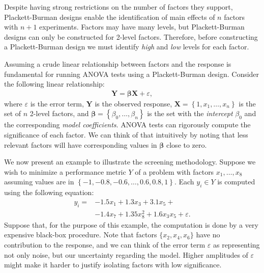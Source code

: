 \documentclass[conference]{IEEEtran}
\begin{document}
Despite having strong restrictions on the number of factors they support,
Plackett-Burman designs enable the identification of main effects of \(n\) factors
with \(n + 1\) experiments. Factors may have many levels, but Plackett-Burman
designs can only be constructed for 2-level factors. Therefore, before
constructing a Plackett-Burman design we must identify \emph{high} and \emph{low} levels
for each factor.

Assuming a crude linear relationship between factors and the response is
fundamental for running ANOVA tests using a Plackett-Burman design. Consider the
following linear relationship:
\vspace{-5pt}
{\normalsize
\begin{align}
\mathbf{Y} = \bm{\beta}\mathbf{X} + \varepsilon,
\label{eq:linear_assumption}
\end{align}
}
\vspace{-1pt}
where \(\varepsilon\) is the error term, \(\mathbf{Y}\) is the observed response,
\(\mathbf{X} = \left\{1, x_1,\dots,x_n\right\}\) is the set of \(n\) 2-level
factors, and \(\bm{\beta} = \left\{\beta_0,\dots,\beta_n\right\}\) is the set with
the \emph{intercept} \(\beta_0\) and the corresponding \emph{model coefficients}. ANOVA
tests can rigorously compute the significance of each factor. We can think of
that intuitively by noting that less relevant factors will have corresponding
values in \(\bm{\beta}\) close to zero.

We now present an example to illustrate the screening methodology. Suppose we
wish to minimize a performance metric \(Y\) of a problem with factors
\(x_1,\dots,x_8\) assuming values are in \(\left\{-1, -0.8, -0.6, \dots, 0.6, 0.8,
1\right\}\). Each \(y_i \in Y\) is computed using the following equation:
\vspace{-5pt}
{\normalsize
\begin{align}
\label{eq:real_model}
y_i = & -1.5x_1 + 1.3x_3 + 3.1x_5 + \\
& -1.4x_7 + 1.35x_8^2 + 1.6x_3x_5 + \varepsilon. \nonumber
\end{align}
}
\vspace{-1pt}
Suppose that, for the purpose of this example, the computation is done by a very
expensive black-box procedure. Note that factors \(\{x_2,x_4,x_6\}\) have no
contribution to the response, and we can think of the error term \(\varepsilon\)
as representing not only noise, but our uncertainty regarding the model. Higher
amplitudes of \(\varepsilon\) might make it harder to justify isolating factors
with low significance.
\end{document}

